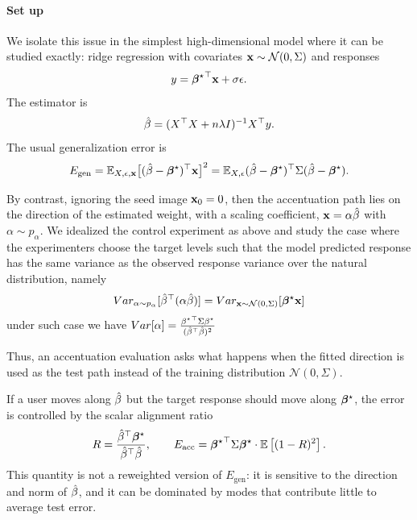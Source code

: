 \documentclass{article}
\theoremstyle{plain}
\theoremstyle{definition}
\theoremstyle{remark}
\begin{document}
\paragraph{Set up}
We isolate this issue in the simplest high-dimensional model where it can be studied exactly: ridge regression with covariates $\mathbf{x}\sim\mathcal{N}(0,\Sigma)$ and responses
\begin{equation}
    y = {\boldsymbol{\beta}^{\star}}^{\top} \mathbf{x} + \sigma \epsilon .
\end{equation}
The estimator is
\begin{equation}
    \hat{\beta} = (X^\top X + n\lambda I)^{-1}X^\top y.
\end{equation}
The usual generalization error is
\begin{equation}
    E_{\mathrm{gen}} = \mathbb{E}_{X,\epsilon,\mathbf{x}}\bigl[(\hat{\beta}-\boldsymbol{\beta}^{\star})^\top \mathbf{x}\bigr]^2
    = \mathbb{E}_{X,\epsilon}(\hat{\beta}-\boldsymbol{\beta}^{\star})^\top\Sigma(\hat{\beta}-\boldsymbol{\beta}^{\star}).
\end{equation}

By contrast, ignoring the seed image $\mathbf{x}_0=0$, then the accentuation path lies on the direction of the estimated weight, with a scaling coefficient, $\mathbf{x}=\alpha \hat{\beta}$ with $\alpha\sim p_\alpha$.
We idealized the control experiment as above and study the case where the experimenters choose the target levels such that the model predicted response has the same variance as the observed response variance over the natural distribution, namely
$$Var_{\alpha\sim p_\alpha}[\hat{\beta}^\top (\alpha \hat{\beta})]=Var_{\mathbf{x}\sim\mathcal{N}(0,\Sigma)}[\boldsymbol{\beta}^{\star} \mathbf{x}]$$
under such case we have $Var[\alpha]=\frac{{{\beta^{\star}}}^{\top}\Sigma{\beta^{\star}}}{({\hat{\beta}}^{\top}\hat{\beta})^{2}}$

Thus, an accentuation evaluation asks what happens when the fitted direction is used as the test path instead of the training distribution $\mathcal{N}(0,\Sigma)$.


If a user moves along $\hat{\beta}$ but the target response should move along $\boldsymbol{\beta}^{\star}$, the error is controlled by the scalar alignment ratio
\begin{equation}
    R=\frac{\hat{\beta}^\top\boldsymbol{\beta}^{\star}}{\hat{\beta}^\top\hat{\beta}},
    \qquad
    E_{\mathrm{acc}} = {\boldsymbol{\beta}^{\star}}^{\top}\Sigma\boldsymbol{\beta}^{\star} \cdot \mathbb{E}\left[(1-R)^2\right].
\end{equation}
This quantity is not a reweighted version of $E_{\mathrm{gen}}$: it is sensitive to the direction and norm of $\hat{\beta}$, and it can be dominated by modes that contribute little to average test error.
\end{document}
